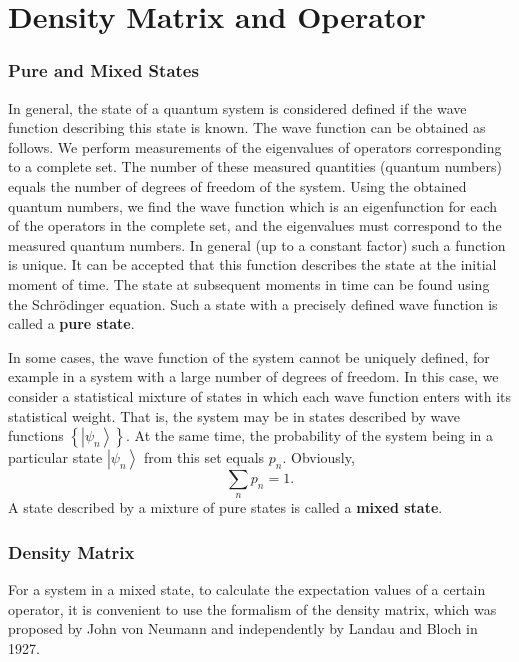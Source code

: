 \chapter{Density Matrix and Operator}
\label{AddState}

\subsection{Pure and Mixed States}
In general, the state of a quantum system is considered defined if
the wave function describing this state is known. The wave function
can be obtained as follows. We perform measurements of the eigenvalues
of operators corresponding to a complete set. The number of these measured
quantities (quantum numbers) equals the number of degrees of freedom of the system. Using the obtained quantum numbers,
we find the wave function which
is an eigenfunction for each of the operators in the complete set,
and the eigenvalues must correspond to the measured quantum numbers.
In general (up to a constant factor) such
a function is unique. It can be accepted that this function describes the state
at the initial moment of time. The state at subsequent moments in time
can be found using the Schrödinger equation. Such a state with
a precisely defined wave function is called
a \textbf{pure state}.

In some cases, the wave function of the system cannot be uniquely
defined, for example in a system with a large number of degrees of freedom.
In this case, we consider a statistical mixture of states in which
each wave function enters with its statistical weight. That is,
the system may be in states described by wave functions
\(\left\{\left|\psi_n\right>\right\}\). At the same time, the probability
of the system being in a particular state \(\left|\psi_n\right>\) from
this set equals \(p_n\). Obviously,
\[
\sum_n p_n = 1.
\]
A state described by a mixture of pure states is called
a \textbf{mixed state}.

\subsection{Density Matrix}
For a system in a mixed state, to calculate the expectation values of a certain operator, it is convenient to use the formalism of the density matrix, which was proposed by John von Neumann and
independently by Landau and Bloch in 1927.

